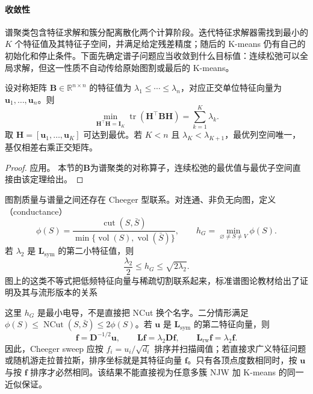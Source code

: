 \paragraph{收敛性}
谱聚类包含特征求解和簇分配离散化两个计算阶段。迭代特征求解器需找到最小的 $K$ 个特征值及其特征子空间，并满足给定残差精度；随后的 K-means 仍有自己的初始化和停止条件。下面先确定谱子问题应当收敛到什么目标值：连续松弛可以全局求解，但这一性质不自动传给原始图割或最后的 K-means。

\begin{theorem}
 \label{thm:clustering-rayleigh}
 设对称矩阵 $\bm{B}\in\mathbb{R}^{n\times n}$ 的特征值为 $\lambda_1\leq\cdots\leq\lambda_n$，对应正交单位特征向量为 $\bm{u}_1,\ldots,\bm{u}_n$。则
 \[
 \min_{\bm{H}^{\top}\bm{H}=\bm{I}_K}
 \operatorname{tr}(\bm{H}^{\top}\bm{B}\bm{H})
 =\sum_{k=1}^K\lambda_k.
 \]
 取 $\bm{H}=[\bm{u}_1,\ldots,\bm{u}_K]$ 可达到最优。若 $K<n$ 且 $\lambda_K<\lambda_{K+1}$，最优列空间唯一，基仅相差右乘正交矩阵。
\end{theorem}
\begin{proof}
应用。
本节的$\bm B$为谱聚类的对称算子，连续松弛的最优值与最优子空间直接由该定理给出。
\end{proof}

图割质量与谱量之间还存在 Cheeger 型联系。对连通、非负无向图，定义（conductance）
\[
 \phi(S)=
 \frac{\operatorname{cut}(S,\bar S)}
 {\min\{\operatorname{vol}(S),\operatorname{vol}(\bar S)\}},
 \qquad h_G=\min_{\varnothing\ne S\ne V}\phi(S).
\]
若 $\lambda_2$ 是 $\bm{L}_{\mathrm{sym}}$ 的第二小特征值，则
\begin{equation}
 \frac{\lambda_2}{2}\leq h_G\leq\sqrt{2\lambda_2}.
 \label{eq:clustering-cheeger}
\end{equation}
图上的这类不等式把低频特征向量与稀疏切割联系起来，标准谱图论教材给出了证明及其与流形版本的关系

这里 $h_G$ 是最小电导，不是直接把 NCut 换个名字。二分情形满足 $\phi(S)\leq\operatorname{NCut}(S,\bar S)\leq2\phi(S)$。若 $\bm{u}$ 是 $\bm{L}_{\mathrm{sym}}$ 的第二特征向量，则
\[
 \bm{f}=\bm{D}^{-1/2}\bm{u},
 \qquad
 \bm{L}\bm{f}=\lambda_2\bm{D}\bm{f},
 \qquad
 \bm{L}_{\mathrm{rw}}\bm{f}=\lambda_2\bm{f}.
\]
因此，Cheeger sweep 应按 $f_i=u_i/\sqrt{d_i}$ 排序并扫描阈值；若直接求广义特征问题或随机游走拉普拉斯，排序坐标就是其特征向量 $\bm{f}$。只有各顶点度数相同时，按 $\bm{u}$ 与按 $\bm{f}$ 排序才必然相同。该结果不能直接视为任意多簇 NJW 加 K-means 的同一近似保证。

